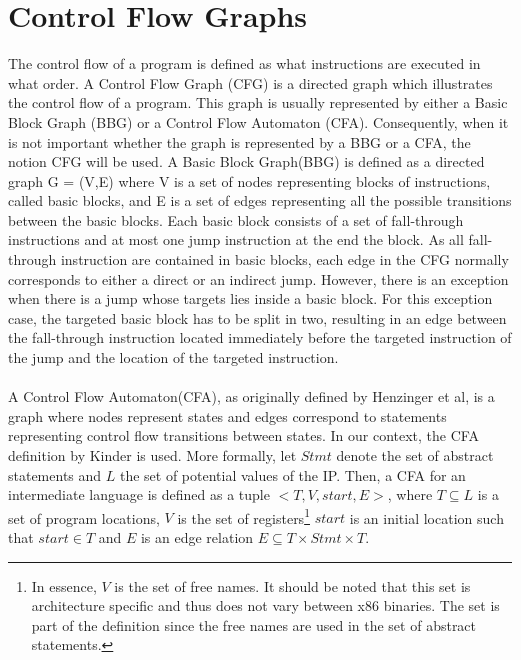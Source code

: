 \documentclass{kththesis}
\newcommand{\fbcomment}[1]{{#1}}
\renewcommand{\fbcomment}[1]{}
\begin{document}
\section{Control Flow Graphs}
\fbcomment{\color{red}Goal: Introduce the concept of CFG, BBG and CFA as well as describing the diference between them. Additionally, explain when a generalised CFA isn't equivalent to the common CFA.}
The control flow of a program is defined as what instructions are executed in what order. A Control Flow Graph (CFG) is a directed graph which illustrates the control flow of a program. This graph is usually represented by either a Basic Block Graph (BBG) or a Control Flow Automaton (CFA). Consequently, when it is not important whether the graph is represented by a BBG or a CFA, the notion CFG will be used. 
\clearpage
\noindent
A Basic Block Graph(BBG) is defined as a directed graph G = (V,E) where V is a set of nodes representing blocks of instructions, called basic blocks, and E is a set of edges representing all the possible transitions between the basic blocks. Each basic block consists of a set of fall-through instructions and at most one jump instruction at the end the block. As all fall-through instruction are contained in basic blocks, each edge in the CFG normally corresponds to either a direct or an indirect jump. However, there is an exception when there is a jump whose targets lies inside a basic block. For this exception case, the targeted basic block has to be split in two, resulting in an edge between the fall-through instruction located immediately before the targeted instruction of the jump and the location of the targeted instruction. 
\\ \\ 
A Control Flow Automaton(CFA), as originally defined by Henzinger et al\cite{lazyAbstraction}, is a graph where nodes represent states and edges correspond to statements representing control flow transitions between states. In our context, the CFA definition by Kinder\cite{Jakstab} is used. More formally, let $Stmt$ denote the set of abstract statements and $L$ the set of potential values of the IP. Then, a CFA for an intermediate language is defined as a tuple $<T,V,start,E>$, where $T \subseteq L$ is a set of program locations, $V$ is the set of registers\footnote{In essence, $V$ is the set of free names. It should be noted that this set is architecture specific and thus does not vary between x86 binaries. The set is part of the definition since the free names are used in the set of abstract statements.} $start$ is an initial location such that $start \in T$ and $E$ is an edge relation $E \subseteq T \times Stmt \times T$. 
\end{document}
